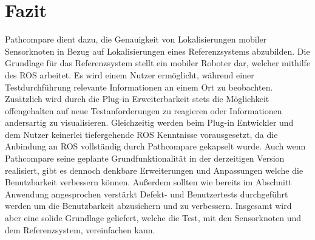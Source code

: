 \chapter{Fazit}
\label{sec:conclusion}
Pathcompare dient dazu, die Genauigkeit von Lokalisierungen mobiler
Sensorknoten in Bezug auf Lokalisierungen eines Referenzsystems abzubilden.
Die Grundlage für das Referenzsystem stellt ein mobiler Roboter dar, welcher
mithilfe des ROS arbeitet. 
Es wird einem Nutzer ermöglicht, während einer Testdurchführung
relevante Informationen an einem Ort zu beobachten. Zusätzlich wird durch die
Plug-in Erweiterbarkeit stets die Möglichkeit offengehalten auf neue
Testanforderungen zu reagieren oder Informationen andersartig zu visualisieren.
Gleichzeitig werden beim Plug-in Entwickler und dem Nutzer keinerlei
tiefergehende ROS Kenntnisse vorausgesetzt, da die Anbindung an ROS vollständig
durch Pathcompare gekapselt wurde. Auch wenn Pathcompare seine geplante
Grundfunktionalität in der derzeitigen Version realisiert, gibt es dennoch
denkbare Erweiterungen und Anpassungen welche die Benutzbarkeit verbessern
können.  Außerdem sollten wie bereits im Abschnitt Anwendung angesprochen
verstärkt Defekt- und Benutzertests durchgeführt werden um die Benutzbarkeit
abzusichern und zu verbessern. Insgesamt wird aber eine solide Grundlage
geliefert, welche die Test, mit den Sensorknoten und dem Referenzsystem,
vereinfachen kann.

